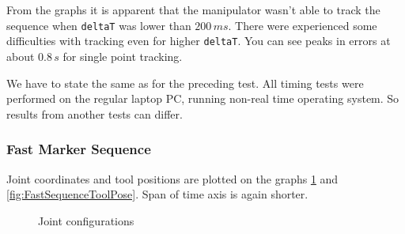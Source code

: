 \documentclass[]{scrartcl}
\begin{document}
From the graphs it is apparent that the manipulator wasn't able to track the sequence when \texttt{deltaT} was lower than $200\,ms$. There were experienced some difficulties with tracking even for higher \texttt{deltaT}. You can see peaks in errors at about $0.8\, s$ for single point tracking.

We have to state the same as for the preceding test. All timing tests were performed on the regular laptop PC, running non-real time operating system. So results from another tests can differ.

\subsubsection*{Fast Marker Sequence}
Joint coordinates and tool positions are plotted on the graphs \ref{fig:FastSequenceJoints} and \ref{fig:FastSequenceToolPose}. Span of time axis is again shorter.

\begin{figure}[!htp]
	\hfill
	\caption{Joint configurations}
	\label{fig:FastSequenceJoints}
\end{figure}
\end{document}
